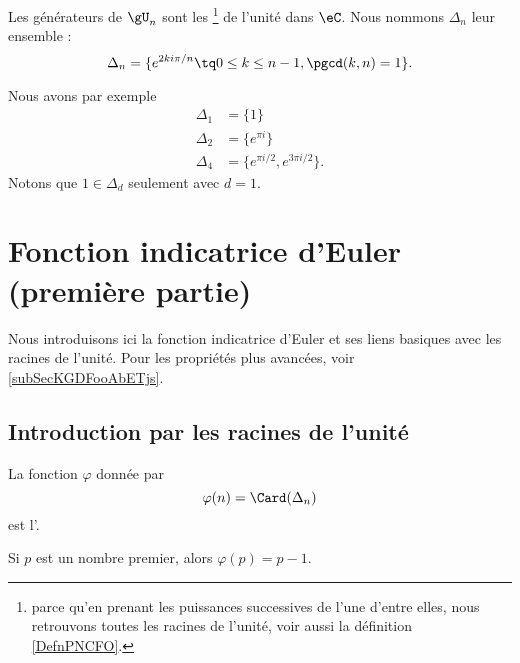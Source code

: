 \begin{definition}\label{DefLYGTooFPOYGZ}
    Les générateurs de \( \gU_n\) sont les \footnote{parce qu'en prenant les puissances successives de l'une d'entre elles, nous retrouvons toutes les racines de l'unité, voir aussi la définition \ref{DefnPNCFO}.} de l'unité dans \( \eC\). Nous nommons \( \Delta_n\) leur ensemble :
\begin{equation}
    \Delta_n=\{  e^{2ki\pi/n}\tq 0\leq k\leq n-1,\pgcd(k,n)=1 \}.
\end{equation}
\end{definition}
Nous avons par exemple
\begin{subequations}
    \begin{align}
        \Delta_1&=\{ 1 \}\\
        \Delta_2&=\{  e^{\pi i} \}\\
        \Delta_4&=\{  e^{\pi i/2}, e^{3\pi i/2} \}.
    \end{align}
\end{subequations}
Notons que \( 1\in \Delta_d\) seulement avec \( d=1\).


\section{Fonction indicatrice d'Euler (première partie)}

Nous introduisons ici la fonction indicatrice d'Euler et ses liens basiques avec les racines de l'unité. Pour les propriétés plus avancées, voir \ref{subSecKGDFooAbETjs}.

\subsection{Introduction par les racines de l'unité}

\begin{definition}      \label{DEFooWYIGooRVBTil}
La fonction \( \varphi\) donnée par
\begin{equation}    \label{EqEulerGqPsvi}
    \varphi(n)=\Card(\Delta_n)
\end{equation}
est l'.
\end{definition}
Si \( p\) est un nombre premier, alors \( \varphi(p)=p-1\).

